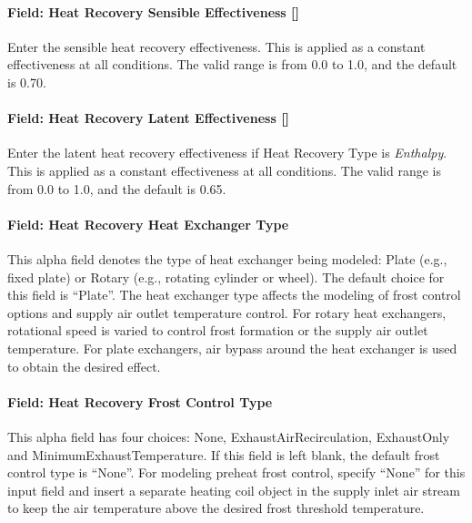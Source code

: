 \paragraph{Field: Heat Recovery Sensible Effectiveness {[]}}\label{field-heat-recovery-sensible-effectiveness}

Enter the sensible heat recovery effectiveness. This is applied as a constant effectiveness at all conditions. The valid range is from 0.0 to 1.0, and the default is 0.70.

\paragraph{Field: Heat Recovery Latent Effectiveness {[]}}\label{field-heat-recovery-latent-effectiveness}

Enter the latent heat recovery effectiveness if Heat Recovery Type is \emph{Enthalpy}. This is applied as a constant effectiveness at all conditions. The valid range is from 0.0 to 1.0, and the default is 0.65.

\paragraph{Field: Heat Recovery Heat Exchanger Type}\label{field-heat-recovery-heat-exchanger-type-3}

This alpha field denotes the type of heat exchanger being modeled: Plate (e.g., fixed plate) or Rotary (e.g., rotating cylinder or wheel). The default choice for this field is ``Plate''. The heat exchanger type affects the modeling of frost control options and supply air outlet temperature control. For rotary heat exchangers, rotational speed is varied to control frost formation or the supply air outlet temperature. For plate exchangers, air bypass around the heat exchanger is used to obtain the desired effect.

\paragraph{Field: Heat Recovery Frost Control Type}\label{field-heat-recovery-frost-control-type-3}

This alpha field has four choices: None, ExhaustAirRecirculation, ExhaustOnly and MinimumExhaustTemperature. If this field is left blank, the default frost control type is ``None''. For modeling preheat frost control, specify ``None'' for this input field and insert a separate heating coil object in the supply inlet air stream to keep the air temperature above the desired frost threshold temperature.

